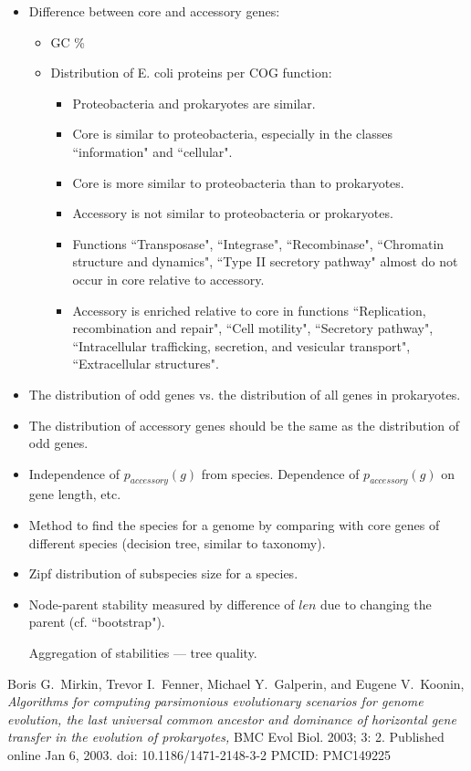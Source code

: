 \documentclass[10pt,a4paper]{article}
\theoremstyle{plain} \newtheorem{Lem}{Lemma}
\begin{document}
\begin{itemize}
  \item Difference between core and accessory genes:
    \begin{itemize}
   	  \item GC \%
	  \item Distribution of E. coli proteins per COG function:
	  \begin{itemize}
    	  \item Proteobacteria and prokaryotes are similar.
    	  \item Core is similar to proteobacteria, especially in the classes ``information" and ``cellular".
    	  \item Core is more similar to proteobacteria than to prokaryotes.
    	  \item Accessory is not similar to proteobacteria or prokaryotes.
    	  \item Functions ``Transposase", ``Integrase", ``Recombinase", ``Chromatin structure and dynamics", ``Type II secretory pathway" almost do not occur in core relative to accessory.
    	  \item Accessory is enriched relative to core in functions ``Replication, recombination and repair", ``Cell motility", ``Secretory pathway", ``Intracellular trafficking, secretion, and vesicular transport", ``Extracellular structures".
	  \end{itemize}
    \end{itemize}
 	\item The distribution of odd genes vs. the distribution of all genes in prokaryotes.
 	\item The distribution of accessory genes should be the same as the distribution of odd genes.
 	\item Independence of $p_{accessory}(g)$ from species. Dependence of $p_{accessory}(g)$ on gene length, etc.
	\item Method to find the species for a genome by comparing with core genes of different species (decision tree, similar to taxonomy).
    \item Zipf distribution of subspecies size for a species.
    \item Node-parent stability measured by difference of $len$ due to changing the parent (cf. ``bootstrap").
          \par Aggregation of stabilities --- tree quality.
\end{itemize}


\begin{thebibliography}{9}

Boris G.~Mirkin, Trevor I.~Fenner, Michael Y.~Galperin, and Eugene V.~Koonin,
\emph{Algorithms for computing parsimonious evolutionary scenarios for genome evolution, the last universal common ancestor and dominance of horizontal gene transfer in the evolution of prokaryotes,}
BMC Evol Biol. 2003; 3: 2.
Published online Jan 6, 2003. doi:  10.1186/1471-2148-3-2
PMCID: PMC149225

\end{thebibliography}
\end{document}
